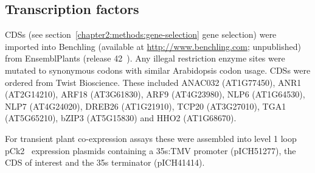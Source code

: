 \documentclass[../main.tex]{subfiles}
\begin{document}
\subsection{Transcription factors}\label{chapter2:methods:synthetic-transcription-factors}

CDSs (see section~{\ref{chapter2:methods:gene-selection}} gene selection) were imported into Benchling (available at \url{http://www.benchling.com}; unpublished) from EnsemblPlants (release 42~\autocite{kerseyEnsemblGenomes20182018}).
Any illegal restriction enzyme sites were mutated to synonymous codons with similar Arabidopsis codon usage.
CDSs were ordered from Twist Bioscience.
These included ANAC032 (AT1G77450), ANR1 (AT2G14210), ARF18 (AT3G61830), ARF9 (AT4G23980), NLP6 (AT1G64530), NLP7 (AT4G24020), DREB26 (AT1G21910), TCP20 (AT3G27010), TGA1 (AT5G65210), bZIP3 (AT5G15830) and HHO2 (AT1G68670).

For transient plant co\hyp{}expression assays these were assembled into level 1 loop pCk2~\autocite{pollakLoopAssemblySimple2018} expression plasmids containing a 35s:TMV promoter (pICH51277), the CDS of interest and the 35s terminator (pICH41414).


\end{document}
